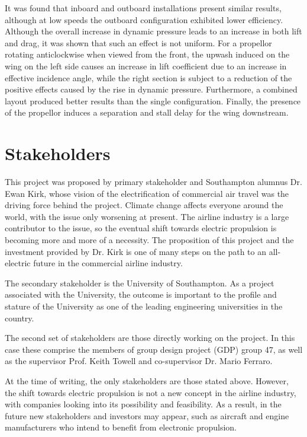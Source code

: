 \documentclass[../../main.tex]{subfiles}
\begin{document}
It was found that inboard and outboard installations present similar results, although at low speeds the outboard configuration exhibited lower efficiency.
Although the overall increase in dynamic pressure leads to an increase in both lift and drag, it was shown that such an effect is not uniform.
For a propellor rotating anticlockwise when viewed from the front, the upwash induced on the wing on the left side causes an increase in lift coefficient due to an increase in effective incidence angle, while the right section is subject to a reduction of the positive effects caused by the rise in dynamic pressure.
Furthermore, a combined layout produced better results than the single configuration.
Finally, the presence of the propellor induces a separation and stall delay for the wing downstream. 

\section{Stakeholders} \label{sec:introduction:stakeholders}


This project was proposed by primary stakeholder and Southampton alumnus Dr. Ewan Kirk, whose vision of the electrification of commercial air travel was the driving force behind the project.
Climate change affects everyone around the world, with the issue only worsening at present.
The airline industry is a large contributor to the issue, so the eventual shift towards electric propulsion is becoming more and more of a necessity.
The proposition of this project and the investment provided by Dr. Kirk is one of many steps on the path to an all-electric future in the commercial airline industry.  

The secondary stakeholder is the University of Southampton.
As a project associated with the University, the outcome is important to the profile and stature of the University as one of the leading engineering universities in the country. 

The second set of stakeholders are those directly working on the project.
In this case these comprise the members of group design project (GDP) group 47, as well as the supervisor Prof. Keith Towell and co-supervisor Dr. Mario Ferraro. 

At the time of writing, the only stakeholders are those stated above.
However, the shift towards electric propulsion is not a new concept in the airline industry, with companies looking into its possibility and feasibility.
As a result, in the future new stakeholders and investors may appear, such as aircraft and engine manufacturers who intend to benefit from electronic propulsion.
\end{document}
